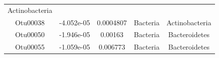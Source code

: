 \documentclass[]{article}
\begin{document}
\begin{longtable}[]{@{}ccccc@{}}
\begin{minipage}[t]{0.27\columnwidth}
Actinobacteria\strut
\end{minipage}\tabularnewline
\begin{minipage}[t]{0.13\columnwidth}\centering\strut
Otu00038\strut
\end{minipage} & \begin{minipage}[t]{0.16\columnwidth}\centering\strut
-4.052e-05\strut
\end{minipage} & \begin{minipage}[t]{0.14\columnwidth}\centering\strut
0.0004807\strut
\end{minipage} & \begin{minipage}[t]{0.13\columnwidth}\centering\strut
Bacteria\strut
\end{minipage} & \begin{minipage}[t]{0.27\columnwidth}\centering\strut
Actinobacteria\strut
\end{minipage}\tabularnewline
\begin{minipage}[t]{0.13\columnwidth}\centering\strut
Otu00050\strut
\end{minipage} & \begin{minipage}[t]{0.16\columnwidth}\centering\strut
-1.946e-05\strut
\end{minipage} & \begin{minipage}[t]{0.14\columnwidth}\centering\strut
0.00163\strut
\end{minipage} & \begin{minipage}[t]{0.13\columnwidth}\centering\strut
Bacteria\strut
\end{minipage} & \begin{minipage}[t]{0.27\columnwidth}\centering\strut
Bacteroidetes\strut
\end{minipage}\tabularnewline
\begin{minipage}[t]{0.13\columnwidth}\centering\strut
Otu00055\strut
\end{minipage} & \begin{minipage}[t]{0.16\columnwidth}\centering\strut
-1.059e-05\strut
\end{minipage} & \begin{minipage}[t]{0.14\columnwidth}\centering\strut
0.006773\strut
\end{minipage} & \begin{minipage}[t]{0.13\columnwidth}\centering\strut
Bacteria\strut
\end{minipage} & \begin{minipage}[t]{0.27\columnwidth}\centering\strut
Bacteroidetes\strut
\end{minipage}\tabularnewline

\end{longtable}
\end{document}
